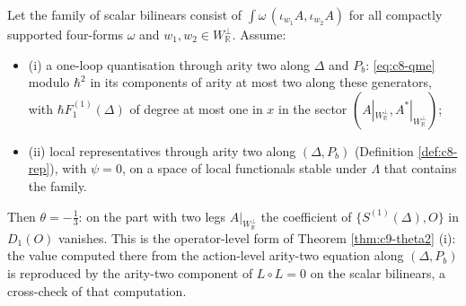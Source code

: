\begin{theorem}
\label{thm:c9-kappa}
Let the family of scalar bilinears consist of $\int\omega\,(\iota_{w_1}A,\iota_{w_2}A)$ for all compactly supported four-forms $\omega$ and $w_1,w_2\in W_{\mathbb R}^\perp$. Assume:
\begin{itemize}
\item (i) a one-loop quantisation through arity two along $\Delta$ and $P_b$: \eqref{eq:c8-qme} modulo $\hbar^2$ in its components of arity at most two along these generators, with $\hbar F_1^{(1)}(\Delta)$ of degree at most one in $x$ in the sector $(A|_{W_{\mathbb R}^\perp},A^*|_{W_{\mathbb R}^\perp})$;
\item (ii) local representatives through arity two along $(\Delta,P_b)$ (Definition \ref{def:c8-rep}), with $\psi=0$, on a space of local functionals stable under $\Lambda$ that contains the family.
\end{itemize}
Then $\theta=-\tfrac13$: on the part with two legs $A|_{W_{\mathbb R}^\perp}$ the coefficient of $\{S^{(1)}(\Delta),O\}$ in $D_1(O)$ vanishes. This is the operator-level form of Theorem \ref{thm:c9-theta2} (i): the value computed there from the action-level arity-two equation along $(\Delta,P_b)$ is reproduced by the arity-two component of $L\circ L=0$ on the scalar bilinears, a cross-check of that computation.
\end{theorem}
